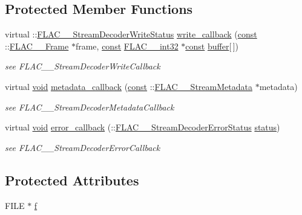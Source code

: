 \subsection*{Protected Member Functions}
\begin{DoxyCompactItemize}
\item 
virtual \+::\hyperlink{group__flac__stream__decoder_ga73f67eb9e0ab57945afe038751bc62c8}{F\+L\+A\+C\+\_\+\+\_\+\+Stream\+Decoder\+Write\+Status} \hyperlink{class_our_decoder_aa30239cce1680b448af774b12bc1db47}{write\+\_\+callback} (\hyperlink{getopt1_8c_a2c212835823e3c54a8ab6d95c652660e}{const} \+::\hyperlink{struct_f_l_a_c_____frame}{F\+L\+A\+C\+\_\+\+\_\+\+Frame} $\ast$frame, \hyperlink{getopt1_8c_a2c212835823e3c54a8ab6d95c652660e}{const} \hyperlink{ordinals_8h_a33fd77bfe6d685541a0c034a75deccdc}{F\+L\+A\+C\+\_\+\+\_\+int32} $\ast$\hyperlink{getopt1_8c_a2c212835823e3c54a8ab6d95c652660e}{const} \hyperlink{structbuffer}{buffer}\mbox{[}$\,$\mbox{]})
\begin{DoxyCompactList}\small\item\em see F\+L\+A\+C\+\_\+\+\_\+\+Stream\+Decoder\+Write\+Callback \end{DoxyCompactList}\item 
virtual \hyperlink{sound_8c_ae35f5844602719cf66324f4de2a658b3}{void} \hyperlink{class_our_decoder_ae0654f6c808ba378890bbcdf0fd54958}{metadata\+\_\+callback} (\hyperlink{getopt1_8c_a2c212835823e3c54a8ab6d95c652660e}{const} \+::\hyperlink{struct_f_l_a_c_____stream_metadata}{F\+L\+A\+C\+\_\+\+\_\+\+Stream\+Metadata} $\ast$metadata)
\begin{DoxyCompactList}\small\item\em see F\+L\+A\+C\+\_\+\+\_\+\+Stream\+Decoder\+Metadata\+Callback \end{DoxyCompactList}\item 
virtual \hyperlink{sound_8c_ae35f5844602719cf66324f4de2a658b3}{void} \hyperlink{class_our_decoder_ad6dcef392b7f1aa8ee1af0d0114f14f2}{error\+\_\+callback} (\+::\hyperlink{group__flac__stream__decoder_ga130e70bd9a73d3c2416247a3e5132ecf}{F\+L\+A\+C\+\_\+\+\_\+\+Stream\+Decoder\+Error\+Status} \hyperlink{rfft2d_test_m_l_8m_a1b5437a866e6f95107b07ba845bc1800}{status})
\begin{DoxyCompactList}\small\item\em see F\+L\+A\+C\+\_\+\+\_\+\+Stream\+Decoder\+Error\+Callback \end{DoxyCompactList}\end{DoxyCompactItemize}
\subsection*{Protected Attributes}
\begin{DoxyCompactItemize}
\item 
F\+I\+LE $\ast$ \hyperlink{class_our_decoder_a13222ae563d6584722c9cb42a0fa999e}{f}
\end{DoxyCompactItemize}
